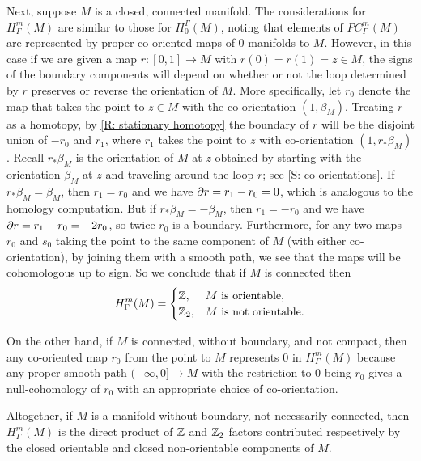 \begin{example}
	Next, suppose $M$ is a closed, connected manifold.
	The considerations for $H^m_\Gamma(M)$ are similar to those for $H_0^\Gamma(M)$, noting that elements of $PC^m_\Gamma(M)$ are represented by proper co-oriented maps of $0$-manifolds to $M$.
	However, in this case if we are given a map $r \colon [0,1] \to M$ with $r(0) = r(1) = z \in M$, the signs of the boundary components will depend on whether or not the loop determined by $r$ preserves or reverse the orientation of $M$.
	More specifically, let $r_0$ denote the map that takes the point to $z \in M$ with the co-orientation $(1, \beta_M)$.
	Treating $r$ as a homotopy, by \cref{R: stationary homotopy} the boundary of $r$ will be the disjoint union of $-r_0$ and $r_1$, where $r_1$ takes the point to $z$ with co-orientation $(1, r_*\beta_M)$.
	Recall $r_*\beta_M$ is the orientation of $M$ at $z$ obtained by starting with the orientation $\beta_M$ at $z$ and traveling around the loop $r$; see \cref{S: co-orientations}.
	If $r_*\beta_M = \beta_M$, then $r_1 = r_0$ and we have $\partial r = r_1 - r_0 = 0$, which is analogous to the homology computation.
	But if $r_*\beta_M = -\beta_M$, then $r_1 = -r_0$ and we have $\partial r = r_1 - r_0 = -2 r_0$, so twice $r_0$ is a boundary.
	Furthermore, for any two maps $r_0$ and $s_0$ taking the point to the same component of $M$ (with either co-orientation), by joining them with a smooth path, we see that the maps will be cohomologous up to sign.
	So we conclude that if $M$ is connected then
	\[H^m_\Gamma(M) =
	\begin{cases}
		\mathbb{Z}, & M \text{ is orientable},\\
		\mathbb{Z}_2, & M \text{ is not orientable}.
	\end{cases}
	\]



	On the other hand, if $M$ is connected, without boundary, and not compact, then any co-oriented map $r_0$ from the point to $M$ represents $0$ in $H_\Gamma^m(M)$ because any proper smooth path $(-\infty,0] \to M$ with the restriction to $0$ being $r_0$ gives a null-cohomology of $r_0$ with an appropriate choice of co-orientation.

	Altogether, if $M$ is a manifold without boundary, not necessarily connected, then $H^m_\Gamma(M)$ is the direct product of $\mathbb{Z}$ and $\mathbb{Z}_2$ factors contributed respectively by the closed orientable and closed non-orientable components of $M$.

\end{example}
